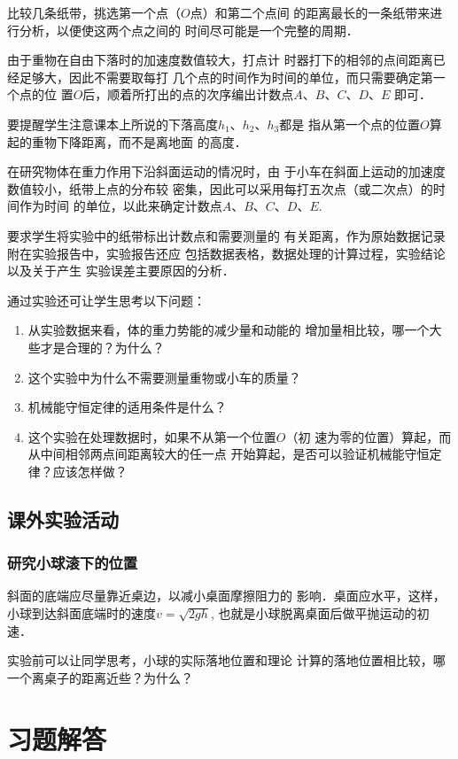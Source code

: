 比较几条纸带，挑选第一个点（$O$点）和第二个点间
的距离最长的一条纸带来进行分析，以便使这两个点之间的
时间尽可能是一个完整的周期．

由于重物在自由下落时的加速度数值较大，打点计
时器打下的相邻的点间距离已经足够大，因此不需要取每打
几个点的时间作为时间的单位，而只需要确定第一个点的位
置$O$后，顺着所打出的点的次序编出计数点$A$、$B$、$C$、$D$、$E$
即可．

要提醒学生注意课本上所说的下落高度$h_1$、$h_2$、$h_3$都是
指从第一个点的位置$O$算起的重物下降距离，而不是离地面
的高度．

在研究物体在重力作用下沿斜面运动的情况时，由
于小车在斜面上运动的加速度数值较小，纸带上点的分布较
密集，因此可以采用每打五次点（或二次点）的时间作为时间
的单位，以此来确定计数点$A$、$B$、$C$、$D$、$E$.

要求学生将实验中的纸带标出计数点和需要测量的
有关距离，作为原始数据记录附在实验报告中，实验报告还应
包括数据表格，数据处理的计算过程，实验结论以及关于产生
实验误差主要原因的分析．

通过实验还可让学生思考以下问题：
\begin{enumerate}
\item 从实验数据来看，体的重力势能的减少量和动能的
增加量相比较，哪一个大些才是合理的？为什么？
\item 这个实验中为什么不需要测量重物或小车的质量？
\item 机械能守恒定律的适用条件是什么？
\item 这个实验在处理数据时，如果不从第一个位置$O$（初
速为零的位置）算起，而从中间相邻两点间距离较大的任一点
开始算起，是否可以验证机械能守恒定律？应该怎样做？
\end{enumerate}

\subsection{课外实验活动}
\subsubsection{研究小球滚下的位置}
斜面的底端应尽量靠近桌边，以减小桌面摩擦阻力的
影响．桌面应水平，这样，小球到达斜面底端时的速度$v
=\sqrt{2gh}$, 也就是小球脱离桌面后做平抛运动的初速．

实验前可以让同学思考，小球的实际落地位置和理论
计算的落地位置相比较，哪一个离桌子的距离近些？为什么？


\section{习题解答}
